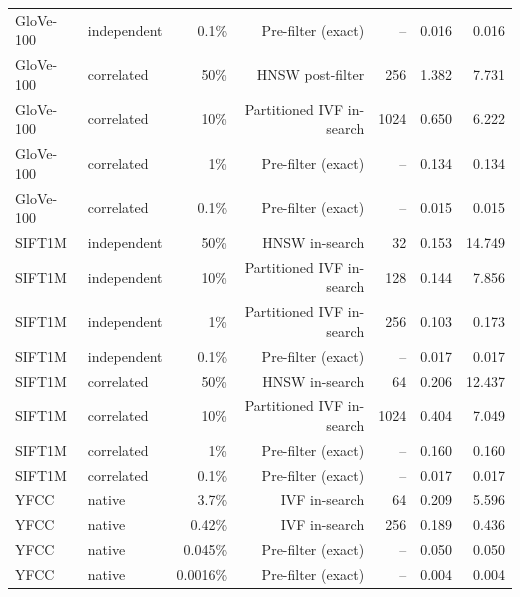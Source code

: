 \begin{table}[t]
\begin{tabular}{llrrrrr}
GloVe-100 & independent & 0.1\% & Pre-filter (exact) & – & 0.016 & 0.016 \\
GloVe-100 & correlated & 50\% & HNSW post-filter & 256 & 1.382 & 7.731 \\
GloVe-100 & correlated & 10\% & Partitioned IVF in-search & 1024 & 0.650 & 6.222 \\
GloVe-100 & correlated & 1\% & Pre-filter (exact) & – & 0.134 & 0.134 \\
GloVe-100 & correlated & 0.1\% & Pre-filter (exact) & – & 0.015 & 0.015 \\
SIFT1M & independent & 50\% & HNSW in-search & 32 & 0.153 & 14.749 \\
SIFT1M & independent & 10\% & Partitioned IVF in-search & 128 & 0.144 & 7.856 \\
SIFT1M & independent & 1\% & Partitioned IVF in-search & 256 & 0.103 & 0.173 \\
SIFT1M & independent & 0.1\% & Pre-filter (exact) & – & 0.017 & 0.017 \\
SIFT1M & correlated & 50\% & HNSW in-search & 64 & 0.206 & 12.437 \\
SIFT1M & correlated & 10\% & Partitioned IVF in-search & 1024 & 0.404 & 7.049 \\
SIFT1M & correlated & 1\% & Pre-filter (exact) & – & 0.160 & 0.160 \\
SIFT1M & correlated & 0.1\% & Pre-filter (exact) & – & 0.017 & 0.017 \\
YFCC & native & 3.7\% & IVF in-search & 64 & 0.209 & 5.596 \\
YFCC & native & 0.42\% & IVF in-search & 256 & 0.189 & 0.436 \\
YFCC & native & 0.045\% & Pre-filter (exact) & – & 0.050 & 0.050 \\
YFCC & native & 0.0016\% & Pre-filter (exact) & – & 0.004 & 0.004 \\
\bottomrule
\end{tabular}
\end{table}
